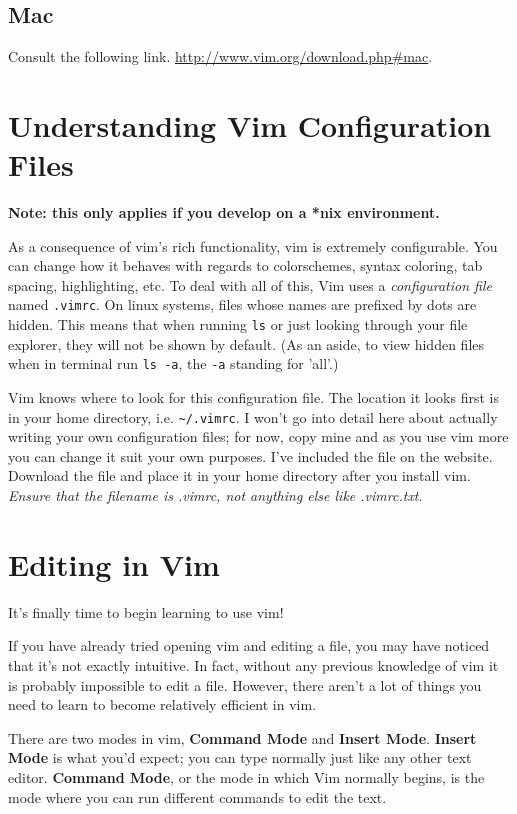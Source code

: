 \subsection{Mac}
Consult the following link. \url{http://www.vim.org/download.php#mac}.

\section{Understanding Vim Configuration Files}
{\bf Note: this only applies if you develop on a *nix environment.}

As a consequence of vim's rich functionality, vim is 
extremely configurable. You can change how it behaves with regards to 
colorschemes, syntax coloring, tab spacing, highlighting, etc. 
To deal with all of this, Vim uses a \emph{configuration file} named 
\texttt{.vimrc}. On linux systems, files whose names are prefixed by dots 
are hidden. This means that when running \texttt{ls}
or just looking through your file explorer, they will not be shown by default.
(As an aside, to view hidden files when in terminal run
\texttt{ls -a}, the \texttt{-a} standing for 'all'.)

Vim knows where to look for this configuration file. The location 
it looks first is in your home directory, i.e. \texttt{\textasciitilde/.vimrc}. I won't
go into detail here about actually writing your own configuration files;
for now, copy mine and as you use vim more you can change it suit
your own purposes. I've included the file on the website. 
Download the file and place it in your home directory after you install vim.
{\em Ensure that the filename is .vimrc, not anything else like .vimrc.txt}.

\section{Editing in Vim}
It's finally time to begin learning to use vim!

If you have already tried opening vim and editing a file, you may have
noticed that it's not exactly intuitive. In fact, without any previous
knowledge of vim it is probably impossible to edit a file. 
However, there aren't a lot of things you need to learn to become
relatively efficient in vim. 

There are two modes in vim, {\bf Command Mode} and {\bf Insert Mode}.
{\bf Insert Mode} is what you'd expect; you can type normally just
like any other text editor. {\bf Command Mode}, or the mode in which
Vim normally begins, is the mode where you can run different commands
to edit the text. 

